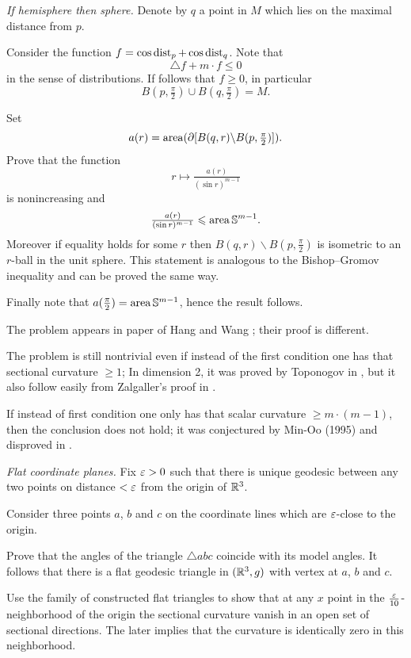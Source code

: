 \textit{If hemisphere then sphere.}
Denote by $q$ a point in $M$ which lies on the maximal distance from $p$.

Consider the function $f=\cos \operatorname{\rm dist}_p+\cos\operatorname{\rm dist}_q$.
Note that 
\[\triangle f+m\cdot f\le 0\] 
in the sense of distributions.
If follows that $f\ge 0$, in particular 
\[B(p,\tfrac\pi2)\cup B(q,\tfrac\pi2)=M.\]

Set \[a(r)=\operatorname{\rm area}(\partial [B(q,r)\backslash B(p,\tfrac\pi2)]).\]
Prove that the function
\[r \mapsto \tfrac{a(r)}{(\sin r)^{m-1}}\]
is nonincreasing 
and 
\[\tfrac{a(r)}{(\sin r)^{m-1}}\leqslant\operatorname{\rm area}\mathbb{S}^{m-1}.\]
Moreover if equality holds for some $r$ then $B(q,r)\backslash B(p,\tfrac\pi2)$ is isometric to an $r$-ball in the unit sphere.
This statement is analogous to the Bishop--Gromov inequality and can be proved the same way.

Finally note that $a(\tfrac\pi2)=\operatorname{\rm area}\mathbb{S}^{m-1}$,
hence the result follows.
 

The problem appears in paper of Hang %
and Wang %
\cite{hang-wang};
their proof is different.

The problem is still nontrivial 
even if instead of the first condition one has that sectional curvature $\ge 1$;
In dimension 2, it was proved by Toponogov in \cite{toponogov},
but it also follow easily from Zalgaller's  proof in \cite{zalgaller-shperical-polygon}.


If instead of first condition one only has that scalar curvature $\ge m\cdot(m-1)$, then the conclusion does not hold; 
it was conjectured by Min-Oo (1995) and disproved in \cite{brendle-marques-neve}.



\textit{Flat coordinate planes.}
Fix $\varepsilon>0$ such that there is unique geodesic between any two points on distance $<\varepsilon$ from the origin of $\mathbb{R}^3$.

Consider three points $a$, $b$ and $c$ 
on the coordinate lines which are $\varepsilon$-close 
to the origin.

Prove that the angles of the triangle $\triangle abc$
coincide with its model angles.
It follows that there is a flat geodesic triangle in $(\mathbb{R}^3,g)$ with vertex at $a$, $b$ and $c$.

Use the family of constructed flat triangles 
to show that at any $x$ point in the $\tfrac{\varepsilon}{10}$-neighborhood of the origin
the sectional curvature 
vanish in an open set of sectional directions.
The later implies that the curvature is identically zero 
in this neighborhood.

